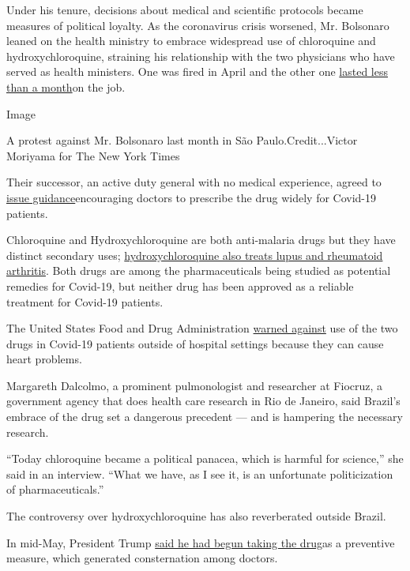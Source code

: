 Under his tenure, decisions about medical and scientific protocols
became measures of political loyalty. As the coronavirus crisis
worsened, Mr. Bolsonaro leaned on the health ministry to embrace
widespread use of chloroquine and hydroxychloroquine, straining his
relationship with the two physicians who have served as health
ministers. One was fired in April and the other one
\href{https://www.nytimes3xbfgragh.onion/2020/05/15/world/americas/brazil-health-minister-bolsonaro.html}{lasted
less than a month}on the job.

Image

A protest against Mr. Bolsonaro last month in São Paulo.Credit...Victor
Moriyama for The New York Times

Their successor, an active duty general with no medical experience,
agreed to
\href{https://www.saude.gov.br/noticias/agencia-saude/46919-ministerio-da-saude-divulga-diretrizes-para-tratamento-medicamentoso-de-pacientes}{issue
guidance}encouraging doctors to prescribe the drug widely for Covid-19
patients.

Chloroquine and Hydroxychloroquine are both anti-malaria drugs but they
have distinct secondary uses;
\href{https://www.nytimes3xbfgragh.onion/article/hydroxychloroquine-coronavirus.html}{hydroxychloroquine
also treats lupus and rheumatoid arthritis}. Both drugs are among the
pharmaceuticals being studied as potential remedies for Covid-19, but
neither drug has been approved as a reliable treatment for Covid-19
patients.

The United States Food and Drug Administration
\href{https://www.fda.gov/drugs/drug-safety-and-availability/fda-cautions-against-use-hydroxychloroquine-or-chloroquine-covid-19-outside-hospital-setting-or}{warned
against} use of the two drugs in Covid-19 patients outside of hospital
settings because they can cause heart problems.

Margareth Dalcolmo, a prominent pulmonologist and researcher at Fiocruz,
a government agency that does health care research in Rio de Janeiro,
said Brazil's embrace of the drug set a dangerous precedent --- and is
hampering the necessary research.

``Today chloroquine became a political panacea, which is harmful for
science,'' she said in an interview. ``What we have, as I see it, is an
unfortunate politicization of pharmaceuticals.''

The controversy over hydroxychloroquine has also reverberated outside
Brazil.

In mid-May, President Trump
\href{https://www.nytimes3xbfgragh.onion/2020/05/18/us/politics/trump-hydroxychloroquine-covid-coronavirus.html}{said
he had begun taking the drug}as a preventive measure, which generated
consternation among doctors.

